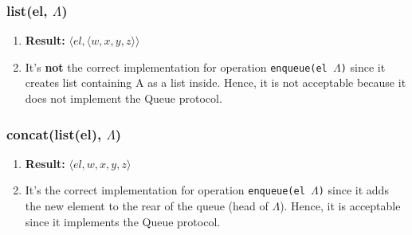 \subsubsection{list(el, $\Lambda$)}
\begin{enumerate}
    \item[] \textbf{Result:} $\langle el, \langle w, x, y, z \rangle \rangle$
    \item[] It's \textbf{not} the correct implementation for operation \texttt{enqueue(el $\Lambda$)} since it creates list containing A as a list inside. Hence, it is not acceptable because it does not implement the Queue protocol.
\end{enumerate}

\subsubsection{concat(list(el), $\Lambda$)}
\begin{enumerate}
    \item[] \textbf{Result:} $\langle el, w, x, y, z \rangle$
    \item[] It's the correct implementation for operation \texttt{enqueue(el $\Lambda$)} since it adds the new element to the rear of the queue (head of $\Lambda$). Hence, it is acceptable since it implements the Queue protocol.
\end{enumerate}
